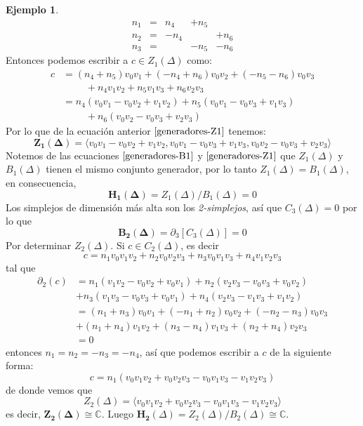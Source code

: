 \documentclass[12pt]{book}
\theoremstyle{definition}
\newtheorem{example}[theorem]{Ejemplo}
\newcounter{in}
\begin{document}
{\begin{example}
\[\begin{array}{rrrrr}
   n_{1} & = & n_{4} & +n_{5} & \\
   n_{2} & = & -n_{4} &      &+n_{6} \\
   n_{3} & = &        &-n_{5}&-n_{6} 
 \end{array}\]
 Entonces podemos escribir a $c\in Z_{1}(\Delta)$ como:
 \begin{align}
   \label{generadores-Z1}
   c&=(n_{4}+n_{5})v_{0}v_{1}+(-n_{4}+n_{6})v_{0}v_{2}+(-n_{5}-n_{6})v_{0}v_{3}\nonumber\\
   &\phantom{{}=n_{4}}+n_{4}v_{1}v_{2}+n_{5}v_{1}v_{3}+n_{6}v_{2}v_{3}\nonumber\\
   &=n_{4}(v_{0}v_{1}-v_{0}v_{2}+v_{1}v_{2})+n_{5}(v_{0}v_{1}-v_{0}v_{3}+v_{1}v_{3})\nonumber\\
   &\phantom{{}=n_{4}}+n_{6}(v_{0}v_{2}-v_{0}v_{3}+v_{2}v_{3})
 \end{align}
 Por lo que de la ecuación anterior $\ref{generadores-Z1}$ tenemos:
 $$\boldsymbol{Z_{1}(\Delta)}=\langle v_{0}v_{1}-v_{0}v_{2}+v_{1}v_{2},v_{0}v_{1}-v_{0}v_{3}+v_{1}v_{3},v_{0}v_{2}-v_{0}v_{3}+v_{2}v_{3}\rangle$$
 Notemos de las ecuaciones $\ref{generadores-B1}$ y
 $\ref{generadores-Z1}$ que  $Z_{1}(\Delta)$ y $B_{1}(\Delta)$ tienen
 el mismo conjunto generador, por lo tanto
 $Z_{1}(\Delta)=B_{1}(\Delta)$, en consecuencia,
 $$\boldsymbol{H_{1}(\Delta)}=Z_{1}(\Delta)/B_{1}(\Delta)=0$$
 Los simplejos de dimensión más alta son los \emph{2-simplejos}, así
 que $C_{3}(\Delta)=0$ por lo que 
 $$\boldsymbol{B_{2}(\Delta)}=\partial_{3}[C_{3}(\Delta)]=0$$ 
 Por determinar $Z_{2}(\Delta)$. Si $c\in C_{2}(\Delta)$, es decir 
 $$c=n_{1}v_{0}v_{1}v_{2}+n_{2}v_{0}v_{2}v_{3}+n_{3}v_{0}v_{1}v_{3}+n_{4}v_{1}v_{2}v_{3}$$
 tal que
 \begin{align*}
   \partial_{2}(c)&=n_{1}(v_{1}v_{2}-v_{0}v_{2}+v_{0}v_{1})+n_{2}(v_{2}v_{3}-v_{0}v_{3}+v_{0}v_{2})\\
   &+n_{3}(v_{1}v_{3}-v_{0}v_{3}+v_{0}v_{1})+n_{4}(v_{2}v_{3}-v_{1}v_{3}+v_{1}v_{2})\\
   &=(n_{1}+n_{3})v_{0}v_{1}+(-n_{1}+n_{2})v_{0}v_{2}+(-n_{2}-n_{3})v_{0}v_{3}\\
   & +(n_{1}+n_{4})v_{1}v_{2}+(n_{3}-n_{4})v_{1}v_{3}+(n_{2}+n_{4})v_{2}v_{3}\\
   &=0
 \end{align*}
 entonces $n_{1}=n_{2}=-n_{3}=-n_{4}$, así que podemos escribir a $c$
 de la siguiente forma: 
 $$c=n_{1}(v_{0}v_{1}v_{2}+v_{0}v_{2}v_{3}-v_{0}v_{1}v_{3}-v_{1}v_{2}v_{3})$$
 de donde vemos que
 $$Z_{2}(\Delta)=\langle v_{0}v_{1}v_{2}+v_{0}v_{2}v_{3}-v_{0}v_{1}v_{3}-v_{1}v_{2}v_{3}\rangle$$
 es decir, $\boldsymbol{Z_{2}(\Delta)}\cong \mathbb{C}$. Luego  $\boldsymbol{H_{2}}(\Delta)=Z_{2}(\Delta)/B_{2}(\Delta)\cong\mathbb{C}$.
\end{example}

}
\end{document}
